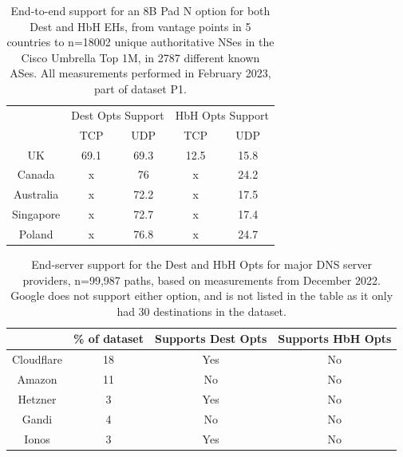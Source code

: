 \documentclass[conference]{IEEEtran}
\begin{document}
\begin{table}[]
\begin{tabular}{c|cc|cc}
\multicolumn{1}{l|}{} & \multicolumn{2}{c|}{Dest Opts Support} & \multicolumn{2}{c}{HbH Opts Support} \\ \cline{2-5} 
\multicolumn{1}{l|}{} & \multicolumn{1}{c|}{TCP}       & UDP      & \multicolumn{1}{c|}{TCP}     & UDP     \\ \hline
UK                    & \multicolumn{1}{c|}{69.1}      & 69.3    & \multicolumn{1}{c|}{12.5}    & 15.8  \\ \hline
Canada                & \multicolumn{1}{c|}{x}      & 76     & \multicolumn{1}{c|}{x}    & 24.2  \\ \hline
Australia             & \multicolumn{1}{c|}{x}        & 72.2      & \multicolumn{1}{c|}{x}    & 17.5  \\ \hline
Singapore             & \multicolumn{1}{c|}{x}      & 72.7    & \multicolumn{1}{c|}{x}    & 17.4   \\ \hline
Poland                & \multicolumn{1}{c|}{x}      & 76.8   & \multicolumn{1}{c|}{x}    & 24.7   
\end{tabular}
\label{tbl:e2e_traversal}
\caption{End-to-end support for an 8B Pad N option for both Dest and HbH EHs, from vantage points in 5 countries to n=18002 unique authoritative NSes in the Cisco Umbrella Top 1M, in 2787 different known ASes. All measurements performed in February 2023, part of dataset P1. }
\end{table}

\begin{table}[]
\begin{tabular}{c|c|c|c}
           & \% of dataset & Supports Dest Opts & Supports HbH Opts \\
\hline
Cloudflare & 18                      & Yes                & No                 \\
\hline
Amazon     & 11                     & No                 & No                 \\
\hline
Hetzner    & 3                     & Yes                & No                 \\
\hline
Gandi      & 4                     & No                 & No                 \\
\hline
Ionos      & 3                    & Yes                & No                
\end{tabular}
\label{tbl:provider_support}
\caption{End-server support for the Dest and HbH Opts for major DNS server providers, n=99,987 paths, based on measurements from December 2022. Google does not support either option, and is not listed in the table as it only had 30 destinations in the dataset.
}
\end{table}
\end{document}
